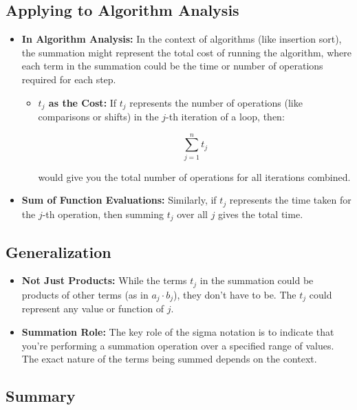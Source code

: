 \documentclass{article}
\begin{document}
\subsection*{Applying to Algorithm Analysis}

\begin{itemize}
    \item \textbf{In Algorithm Analysis:} In the context of algorithms (like insertion sort), the summation might represent the total cost of running the algorithm, where each term in the summation could be the time or number of operations required for each step.

    \begin{itemize}
        \item \textbf{\( t_j \) as the Cost:} If \( t_j \) represents the number of operations (like comparisons or shifts) in the \( j \)-th iteration of a loop, then:

        \[
        \sum_{j=1}^{n} t_j
        \]

        would give you the total number of operations for all iterations combined.
    \end{itemize}

    \item \textbf{Sum of Function Evaluations:} Similarly, if \( t_j \) represents the time taken for the \( j \)-th operation, then summing \( t_j \) over all \( j \) gives the total time.
\end{itemize}

\subsection*{Generalization}

\begin{itemize}
    \item \textbf{Not Just Products:} While the terms \( t_j \) in the summation could be products of other terms (as in \( a_j \cdot b_j \)), they don't have to be. The \( t_j \) could represent any value or function of \( j \).
    \item \textbf{Summation Role:} The key role of the sigma notation is to indicate that you're performing a summation operation over a specified range of values. The exact nature of the terms being summed depends on the context.
\end{itemize}

\subsection*{Summary}
\end{document}
